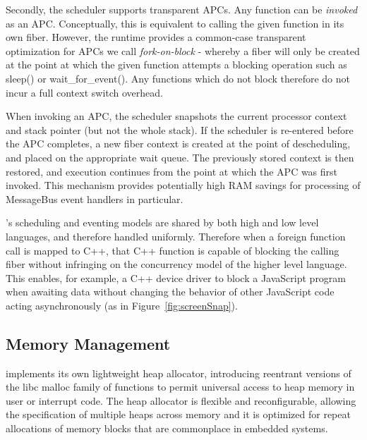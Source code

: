 Secondly, the \CO scheduler supports transparent APCs. Any function can be \emph{invoked} as an APC. Conceptually, this is equivalent to calling the given function in its own fiber. However, the \CO runtime provides a common-case transparent optimization for APCs we call \emph{fork-on-block} - whereby a fiber will only be created at the point at which the given function attempts a blocking operation such as sleep() or wait\_for\_event(). Any functions which do not block therefore do not incur a full context switch overhead.

When invoking an APC, the scheduler snapshots the current processor context and stack pointer (but not the whole stack). If the scheduler is re-entered before the APC completes, a new fiber context is created at the point of descheduling, and placed on the appropriate wait queue. The previously stored context is then restored, and execution continues from the point at which the APC was first invoked. This mechanism provides potentially high RAM savings for processing of MessageBus event handlers in particular.

\CO's scheduling and eventing models are shared by both high and low level languages, and therefore handled uniformly. Therefore when a foreign function call is mapped to C++, that C++ function is capable of blocking the calling fiber without infringing on the concurrency model of the higher level language. This enables, for example, a C++ device driver to block a JavaScript program when awaiting data without changing the behavior of other JavaScript code acting asynchronously (as in Figure~\ref{fig:screenSnap}).


\subsection{Memory Management}
\CO implements its own lightweight heap allocator, introducing reentrant versions of the libc malloc family of functions to permit universal access to heap memory in user or interrupt code. The heap allocator is flexible and reconfigurable, allowing the specification of multiple heaps across memory and it is optimized for repeat allocations of memory blocks that are commonplace in embedded systems.

